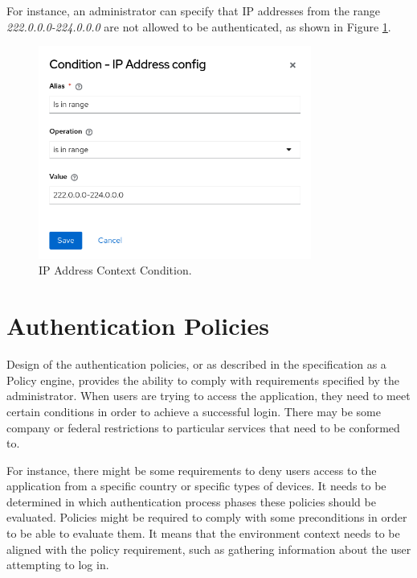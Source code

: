 For instance, an administrator can specify that IP addresses from the range \textit{222.0.0.0-224.0.0.0} are not allowed to be authenticated, as shown in Figure \ref{fig:design-user-context-ip-addr-condition}.

\begin{figure}[htbp]
  \centering
  \includegraphics[width=0.8\textwidth]{img/sections/5-design/ip-address-condition.png}
  \caption{IP Address Context Condition.}
  \label{fig:design-user-context-ip-addr-condition}
\end{figure}

\newpage

\section{Authentication Policies} \label{authentication-policies}
Design of the authentication policies, or as described in the specification as a Policy engine, provides the ability to comply with requirements specified by the administrator.
When users are trying to access the application, they need to meet certain conditions in order to achieve a successful login.
There may be some company or federal restrictions to particular services that need to be conformed to.

For instance, there might be some requirements to deny users access to the application from a specific country or specific types of devices.
It needs to be determined in which authentication process phases these policies should be evaluated.
Policies might be required to comply with some preconditions in order to be able to evaluate them.
It means that the environment context needs to be aligned with the policy requirement, such as gathering information about the user attempting to log in.

